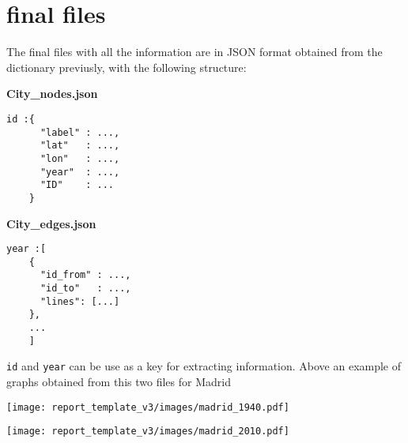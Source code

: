 \newpage
\section{final files}
The final files with all the information are in JSON format obtained from the dictionary previusly, with the following structure:
\noindent

\begin{multicols}{2}

\textbf{City\_nodes.json}

\begin{verbatim}
id :{
      "label" : ..., 
      "lat"   : ...,  
      "lon"   : ...,
      "year"  : ...,
      "ID"    : ...
    }
\end{verbatim}

\columnbreak

\textbf{City\_edges.json}

\begin{verbatim}
year :[
    {
      "id_from" : ...,
      "id_to"   : ...,
      "lines": [...]
    },
    ...
    ]
\end{verbatim}
\end{multicols}
\texttt{id} and \texttt{year} can be use as a key for extracting information. Above an example of graphs obtained from this two files for Madrid 

\begin{multicols}{2}

\begin{minipage}{\linewidth}
    \centering
    \texttt{[image: report\_template\_v3/images/madrid\_1940.pdf]}
\end{minipage}

\columnbreak

\begin{minipage}{\linewidth}
    \centering
    \texttt{[image: report\_template\_v3/images/madrid\_2010.pdf]}
\end{minipage}

\end{multicols}

\newpage